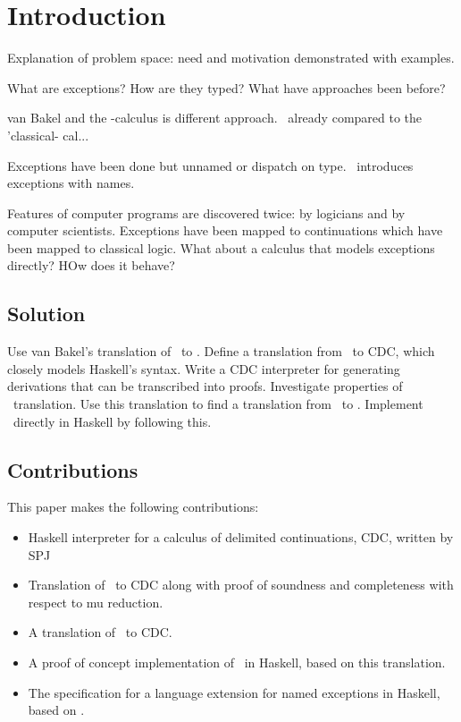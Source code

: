\chapter{Introduction}

Explanation of problem space: need and motivation demonstrated with examples.

What are exceptions? How are they typed? What have approaches been before?

van Bakel and the \ltry-calculus is different approach. \ltry\ already compared
to the 'classical- cal...

Exceptions have been done but unnamed or dispatch on type.
\ltry\ introduces exceptions with names.

Features of computer programs are discovered twice: by logicians and by computer scientists.\cite{Wadler15}
Exceptions have been mapped to continuations which have been mapped to classical logic.
What about a calculus that models exceptions directly?
HOw does it behave?

\section{Solution}
Use van Bakel's translation of \ltry\ to \lmu.
Define a translation from \lmu\ to CDC, which closely models Haskell's syntax.
Write a CDC interpreter for generating derivations that can be transcribed into proofs.
Investigate properties of \lmu\ translation.
Use this translation to find a translation from \ltry\ to \lmu.
Implement \ltry\ directly in Haskell by following this.

\section{Contributions}
This paper makes the following contributions:
\begin{itemize}
\item Haskell interpreter for a calculus of delimited continuations, CDC, written by SPJ
\item Translation of \lmu\ to CDC along with proof of soundness and completeness with respect to mu reduction.
\item A translation of \ltry\ to CDC.
\item A proof of concept implementation of \ltry\ in Haskell, based on this translation.
\item The specification for a language extension for named exceptions in Haskell, based on \ltry.
\end{itemize}
